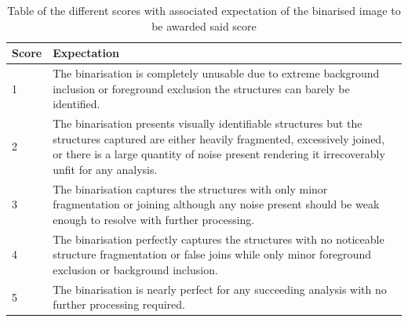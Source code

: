 \begin{table}
	\centering
	\begin{tabularx}{\linewidth}{|l|X|}
		\hline
		\textbf{Score}& \textbf{Expectation}\\
		\hline
		1 & The binarisation is completely unusable due to extreme background inclusion or foreground exclusion the structures can barely be identified.\\
		\hline
		2 & The binarisation presents visually identifiable structures but the structures captured are either heavily fragmented, excessively joined, or there is a large quantity of noise present rendering it irrecoverably unfit for any analysis.\\
		\hline
		3 & The binarisation captures the structures with only minor fragmentation or joining although any noise present should be weak enough to resolve with further processing.\\
		\hline
		4 & The binarisation perfectly captures the structures with no noticeable structure fragmentation or false joins while only minor foreground exclusion or background inclusion.\\
		\hline
		5 & The binarisation is nearly perfect for any succeeding analysis with no further processing required.\\
		\hline
	\end{tabularx}
	\caption[Table of the different scores]{Table of the different scores with associated expectation of the binarised image to be awarded said score}
	\label{tab:rank_table}
\end{table}

\FloatBarrier
